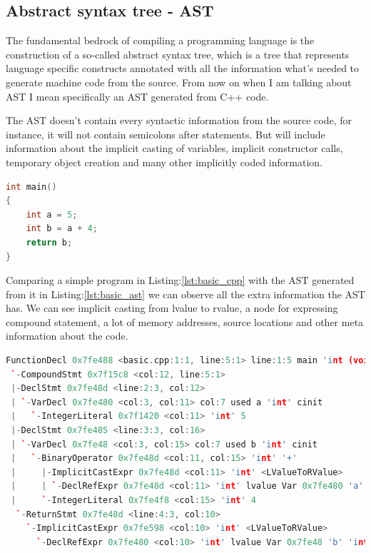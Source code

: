 \subsection{Abstract syntax tree - AST}
\par The fundamental bedrock of compiling a programming language is the construction of a so-called abstract syntax tree, which is a tree that represents language specific constructs annotated with all the information what's needed to generate machine code from the source. From now on when I am talking about AST I mean specifically an AST generated from C++ code. \medskip
\par The AST doesn't contain every syntactic information from the source code, for instance, it will not contain semicolons after statements. But will include information about the implicit casting of variables, implicit constructor calls, temporary object creation and many other implicitly coded information.
\pagebreak
\begin{lstlisting}[language=c++,frame=single, caption={A simple C++ program}, label={lst:basic_cpp}]
int main()
{
	int a = 5;
	int b = a + 4;
	return b;
}
\end{lstlisting}
\par Comparing a simple program in Listing:\ref{lst:basic_cpp} with the AST generated from it in Listing:\ref{lst:basic_ast} we can observe all the extra information the AST has. We can see implicit casting from lvalue to rvalue, a node for expressing compound statement, a lot of memory addresses, source locations and other meta information about the code.
\begin{lstlisting}[basicstyle=\scriptsize, language=c++,frame=single, caption={AST generated}, style=ast, label={lst:basic_ast}]
FunctionDecl 0x7fe488 <basic.cpp:1:1, line:5:1> line:1:5 main 'int (void)'
 `-CompoundStmt 0x7f15c8 <col:12, line:5:1>
 |-DeclStmt 0x7fe48d <line:2:3, col:12>
 | `-VarDecl 0x7fe480 <col:3, col:11> col:7 used a 'int' cinit
 |   `-IntegerLiteral 0x7f1420 <col:11> 'int' 5
 |-DeclStmt 0x7fe485 <line:3:3, col:16>
 | `-VarDecl 0x7fe48 <col:3, col:15> col:7 used b 'int' cinit
 |   `-BinaryOperator 0x7fe48d <col:11, col:15> 'int' '+'
 |     |-ImplicitCastExpr 0x7fe48d <col:11> 'int' <LValueToRValue>
 |     | `-DeclRefExpr 0x7fe48d <col:11> 'int' lvalue Var 0x7fe480 'a' 'int'
 |     `-IntegerLiteral 0x7fe4f8 <col:15> 'int' 4
  `-ReturnStmt 0x7fe48d <line:4:3, col:10>
    `-ImplicitCastExpr 0x7fe598 <col:10> 'int' <LValueToRValue>
      `-DeclRefExpr 0x7fe480 <col:10> 'int' lvalue Var 0x7fe48 'b' 'int'
\end{lstlisting}
